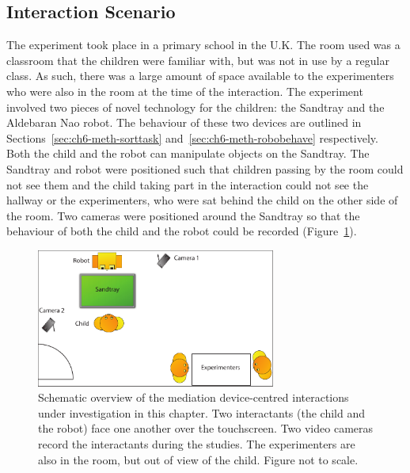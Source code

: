\subsection{Interaction Scenario}\label{sec:ch6-meth-setup}
The experiment took place in a primary school in the U.K. The room used was a classroom that the children were familiar with, but was not in use by a regular class. As such, there was a large amount of space available to the experimenters who were also in the room at the time of the interaction. The experiment involved two pieces of novel technology for the children: the Sandtray and the Aldebaran Nao robot. The behaviour of these two devices are outlined in Sections~\ref{sec:ch6-meth-sorttask} and~\ref{sec:ch6-meth-robobehave} respectively. Both the child and the robot can manipulate objects on the Sandtray. The Sandtray and robot were positioned such that children passing by the room could not see them and the child taking part in the interaction could not see the hallway or the experimenters, who were sat behind the child on the other side of the room. Two cameras were positioned around the Sandtray so that the behaviour of both the child and the robot could be recorded (Figure~\ref{fig:ch6-schem}).

\begin{figure}[t!]
    \centering
    \includegraphics[width=0.7\textwidth]{images/ch6_schematic.pdf}
    \caption{Schematic overview of the mediation device-centred interactions under investigation in this chapter. Two interactants (the child and the robot) face one another over the touchscreen. Two video cameras record the interactants during the studies. The experimenters are also in the room, but out of view of the child. Figure not to scale.}
    \label{fig:ch6-schem}
\end{figure}

